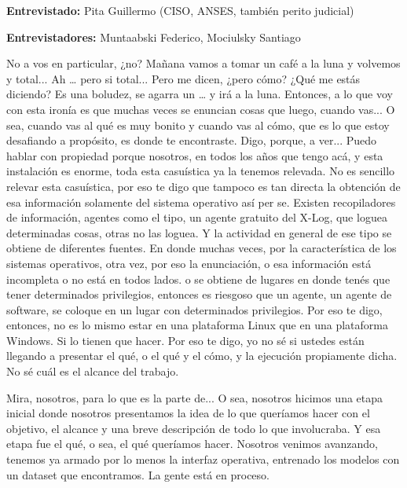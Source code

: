 
\textbf{Entrevistado:} Pita Guillermo (CISO, ANSES, también perito judicial)

\textbf{Entrevistadores:} Muntaabski Federico, Mociulsky Santiago

\begin{description}[leftmargin=0cm, labelsep=0.5cm]
    \item[\textbf{PITA GUILLERMO:}] No a vos en particular, ¿no? Mañana vamos a tomar un café a la luna y volvemos y total... Ah … pero si total... Pero me dicen, ¿pero cómo? ¿Qué me estás diciendo? Es una boludez, se agarra un … y irá a la luna. Entonces, a lo que voy con esta ironía es que muchas veces se enuncian cosas que luego, cuando vas... O sea, cuando vas al qué es muy bonito y cuando vas al cómo, que es lo que estoy desafiando a propósito, es donde te encontraste. Digo, porque, a ver... Puedo hablar con propiedad porque nosotros, en todos los años que tengo acá, y esta instalación es enorme, toda esta casuística ya la tenemos relevada. No es sencillo relevar esta casuística, por eso te digo que tampoco es tan directa la obtención de esa información solamente del sistema operativo así per se. Existen recopiladores de información, agentes como el tipo, un agente gratuito del X-Log, que loguea determinadas cosas, otras no las loguea. Y la actividad en general de ese tipo se obtiene de diferentes fuentes. En donde muchas veces, por la característica de los sistemas operativos, otra vez, por eso la enunciación, o esa información está incompleta o no está en todos lados. o se obtiene de lugares en donde tenés que tener determinados privilegios, entonces es riesgoso que un agente, un agente de software, se coloque en un lugar con determinados privilegios. Por eso te digo, entonces, no es lo mismo estar en una plataforma Linux que en una plataforma Windows. Si lo tienen que hacer. Por eso te digo, yo no sé si ustedes están llegando a presentar el qué, o el qué y el cómo, y la ejecución propiamente dicha. No sé cuál es el alcance del trabajo.

    \item[\textbf{MUNTAABSKI FEDERICO:}] Mira, nosotros, para lo que es la parte de... O sea, nosotros hicimos una etapa inicial donde nosotros presentamos la idea de lo que queríamos hacer con el objetivo, el alcance y una breve descripción de todo lo que involucraba. Y esa etapa fue el qué, o sea, el qué queríamos hacer. Nosotros venimos avanzando, tenemos ya armado por lo menos la interfaz operativa, entrenado los modelos con un dataset que encontramos. La gente está en proceso.


\end{description}
